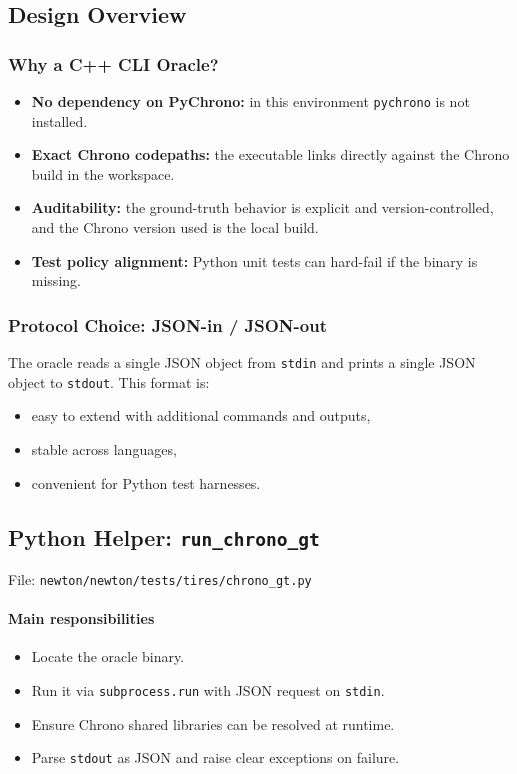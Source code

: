 \subsection{Design Overview}
\subsubsection{Why a C++ CLI Oracle?}
\begin{itemize}
  \item \textbf{No dependency on PyChrono:} in this environment \texttt{pychrono} is not installed.
  \item \textbf{Exact Chrono codepaths:} the executable links directly against the Chrono build in the workspace.
  \item \textbf{Auditability:} the ground-truth behavior is explicit and version-controlled, and the Chrono
        version used is the local build.
  \item \textbf{Test policy alignment:} Python unit tests can hard-fail if the binary is missing.
\end{itemize}

\subsubsection{Protocol Choice: JSON-in / JSON-out}
The oracle reads a single JSON object from \texttt{stdin} and prints a single JSON object to \texttt{stdout}.
This format is:
\begin{itemize}
  \item easy to extend with additional commands and outputs,
  \item stable across languages,
  \item convenient for Python test harnesses.
\end{itemize}

\subsection{Python Helper: \texttt{run\_chrono\_gt}}
\label{sec:substep0-python-helper}
File: \texttt{newton/newton/tests/tires/chrono\_gt.py}

\paragraph{Main responsibilities}
\begin{itemize}
  \item Locate the oracle binary.
  \item Run it via \texttt{subprocess.run} with JSON request on \texttt{stdin}.
  \item Ensure Chrono shared libraries can be resolved at runtime.
  \item Parse \texttt{stdout} as JSON and raise clear exceptions on failure.
\end{itemize}

